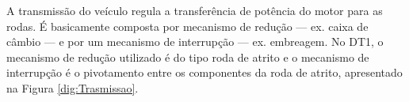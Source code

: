 


A transmissão do veículo regula a transferência de potência do motor para as rodas. É basicamente composta por mecanismo de
redução --- ex. caixa de câmbio --- e por um mecanismo de interrupção --- ex. embreagem. \cite[Cap.~4]{book:Modern_Electric_Vehicles}
No DT1, o mecanismo de redução utilizado é do tipo roda de atrito e o mecanismo de interrupção é o pivotamento entre os componentes da roda de atrito, apresentado na Figura \ref{dig:Trasmissao}.

